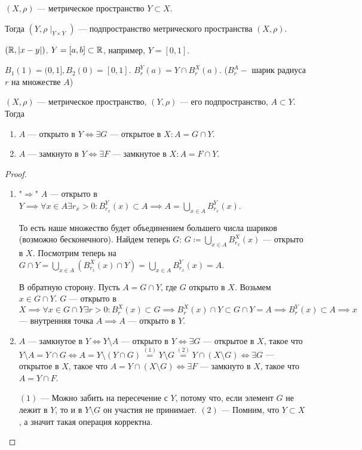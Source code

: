 \begin{definition}
     $(X, \rho)$ --- метрическое пространство  $Y \subset X$.

     Тогда  $(Y, \rho \mid_{Y \times Y})$ --- подпространство метрического пространства  $(X, \rho)$.
\end{definition}
\begin{example}
     $(\mathbb{R}, |x-y|)$.  $Y=[a, b] \subset \mathbb{R}$, например, $Y=[0, 1]$.

      $B_1(1) = (0, 1], B_2(0) = [0, 1]$.  $B_r^Y(a) = Y \cap B_r^X(a)$. ($B^A_r -$ шарик радиуса $r$ на множестве $A$)
\end{example}
\begin{theorem}
     $(X, \rho)$ --- метрическое пространство,  $(Y, \rho)$ --- его подпространство,  $A \subset Y$. Тогда
      \begin{enumerate}
          \item $A$ --- открыто в  $Y \iff \exists G$ --- открытое в  $X\!: A = G \cap Y$. 
          \item $A$ --- замкнуто в  $Y \iff \exists F$ --- замкнутое в  $X\!: A = F \cap Y$.
     \end{enumerate}
\end{theorem}
\begin{proof}
     \slashn
     \begin{enumerate}
         \item "$\Rightarrow$" $A$ --- открыто в  $Y \implies \forall x \in A \exists r_x > 0 \!: B_{r_x}^Y(x) \subset A \implies A = \bigcup\limits_{x \in A}B_{r_x}^Y(x)$.

             То есть наше множество будет объединением большего числа шариков (возможно бесконечного). Найдем теперь  $G$:  $G \coloneqq \bigcup\limits_{x \in A} B_{r_x}^X(x)$ --- открыто в $X$. Посмотрим теперь на  $G \cap Y = \bigcup\limits_{x \in A}(B_{r_x}^X(x) \cap Y) = \bigcup\limits_{x \in A}B_{r_x}^Y(x) = A$.

         В обратную сторону. Пусть $A = G \cap Y$, где  $G$ открыто в  $X$. Возьмем  $x \in G \cap Y$.  $G$ --- открыто в  $X \implies \forall x \in G \cap Y \exists r > 0\!: B_r^X(x) \subset G \implies B_r^X(x) \cap Y \subset G \cap Y = A \implies B_r^Y(x) \subset A \implies x$ --- внутренняя точка $A \implies A$ --- открыто в  $Y$. 

         \item $A$ --- замкнутое в $Y \iff Y \setminus A$ --- открыто в  $Y \iff \exists G$ --- открытое в  $X$, такое что  $Y \setminus A = Y \cap G \iff A = Y \setminus (Y \cap G) \overset{(1)}{=} Y \setminus G \overset{(2)}{=} Y \cap (X \setminus G) \iff \exists G$ --- открытое в  $X$, такое что  $A = Y \cap (X \setminus G) \iff \exists F$ --- замкнуто в  $X$, такое что  $A = Y \cap F$.

             $(1)$ --- Можно забить на пересечение с  $Y$, потому что, если элемент  $G$ не лежит в $Y$, то и в $Y \setminus G$ он участия не принимает.  $(2)$ --- Помним, что  $Y \subset X$, а значит такая операция корректна.
     \end{enumerate}
\end{proof}
